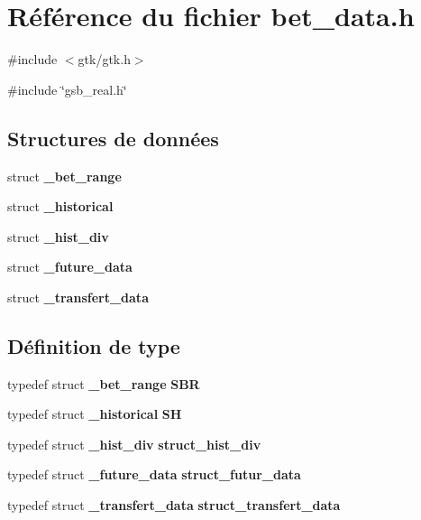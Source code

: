 \section{Référence du fichier bet\_\-data.h}
\label{bet__data_8h}
{\ttfamily \#include $<$gtk/gtk.h$>$}\par
{\ttfamily \#include \char`\"{}gsb\_\-real.h\char`\"{}}\par
\subsection*{Structures de données}
\begin{DoxyCompactItemize}
\item 
struct {\bf \_\-bet\_\-range}
\item 
struct {\bf \_\-historical}
\item 
struct {\bf \_\-hist\_\-div}
\item 
struct {\bf \_\-future\_\-data}
\item 
struct {\bf \_\-transfert\_\-data}
\end{DoxyCompactItemize}
\subsection*{Définition de type}
\begin{DoxyCompactItemize}
\item 
typedef struct {\bf \_\-bet\_\-range} {\bf SBR}
\item 
typedef struct {\bf \_\-historical} {\bf SH}
\item 
typedef struct {\bf \_\-hist\_\-div} {\bf struct\_\-hist\_\-div}
\item 
typedef struct {\bf \_\-future\_\-data} {\bf struct\_\-futur\_\-data}
\item 
typedef struct {\bf \_\-transfert\_\-data} {\bf struct\_\-transfert\_\-data}
\end{DoxyCompactItemize}
